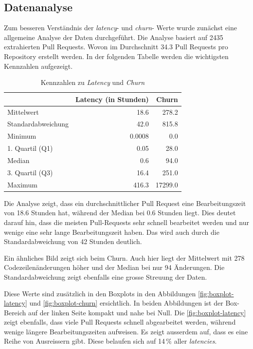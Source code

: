 \subsection{Datenanalyse}
Zum besseren Verständnis der \textit{latency}- und \textit{churn}- Werte wurde zunächst eine allgemeine Analyse der Daten durchgeführt.
Die Analyse basiert auf 2435 extrahierten Pull Requests. Wovon im Durchschnitt 34.3 Pull Requests pro Repository erstellt werden. In der folgenden Tabelle werden die wichtigsten Kennzahlen aufgezeigt.


\begin{table}[htbp]
    \centering
    \caption{Kennzahlen zu \textit{Latency} und \textit{Churn}}
    \begin{tabular}{@{}lrr@{}}
        \toprule
        \textbf & \textbf{Latency (in Stunden)} & \textbf{Churn} \\
         \midrule
        Mittelwert & 18.6 & 278.2 \\
        Standardabweichung &  42.0  & 815.8 \\
        Minimum & 0.0008 & 0.0 \\
        1. Quartil (Q1) & 0.05 & 28.0 \\
        Median & 0.6 & 94.0 \\
        3. Quartil (Q3) &  16.4   & 251.0 \\
        Maximum & 416.3 & 17299.0 \\
        \bottomrule
    \end{tabular}
    \label{tab:deskriptive-kennzahlen}
\end{table}

Die Analyse zeigt, dass ein durchschnittlicher Pull Request eine Bearbeitungszeit von 18.6 Stunden hat, während der Median bei 0.6 Stunden liegt. Dies deutet darauf hin, dass die meisten Pull-Requests sehr schnell bearbeitet werden und nur wenige eine sehr lange Bearbeitungszeit haben. Das wird auch durch die Standardabweichung von 42 Stunden deutlich.

Ein ähnliches Bild zeigt sich beim Churn. Auch hier liegt der Mittelwert mit 278 Codezeilenänderungen höher und der Median bei nur 94 Änderungen. Die Standardabweichung zeigt ebenfalls eine grosse Streuung der Daten.

Diese Werte sind zusätzlich in den Boxplots in den Abbildungen \autoref{fig:boxplot-latency} und \autoref{fig:boxplot-churn} ersichtlich. 
In beiden Abbildungen ist der Box-Bereich auf der linken Seite kompakt und nahe bei Null. 
Die \autoref{fig:boxplot-latency} zeigt ebenfalls, dass viele Pull Requests schnell abgearbeitet werden, während wenige längere Bearbeitungszeiten aufweisen. Es zeigt ausserdem auf, dass es eine Reihe von Ausreissern gibt. Diese belaufen sich auf 14\,\% aller \textit{latencies}.

